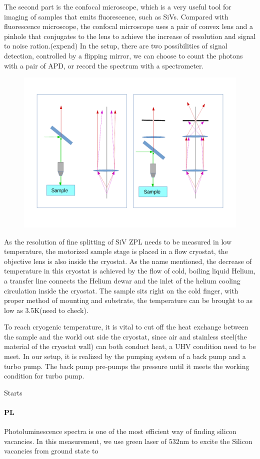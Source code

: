 The second part is the confocal microscope, which is a very useful tool for imaging of samples that emits fluorescence, such as SiVs. Compared with fluorescence microscope, the confocal microscope uses a pair of convex lens and a pinhole that conjugates to the lens to achieve the increase of resolution and signal to noise ration.(expend)
In the setup, there are two possibilities of signal detection, controlled by a flipping mirror, we can choose to count the photons with a pair of APD, or record the spectrum with a spectrometer.
\begin{figure}[h]
\centering
\includegraphics[width=0.7\linewidth]{Figures/pic/microscope}
\caption{}
\label{fig:microscope}
\end{figure}

As the resolution of fine splitting of SiV ZPL needs to be measured in low temperature, the motorized sample stage is placed in a flow cryostat, the objective lens is also inside the cryostat. As the name mentioned, the decrease of temperature in this cryostat is achieved by the flow of cold, boiling liquid Helium, a transfer line connects the Helium dewar and the inlet of the helium cooling circulation inside the cryostat. The sample sits right on the cold finger, with proper method of mounting and substrate, the temperature can be brought to as low as 3.5K(need to check).

To reach cryogenic temperature, it is vital to cut off the heat exchange between the sample and the world out side the cryostat, since air and stainless steel(the material of the cryostat wall) can both conduct heat, a UHV condition need to be meet. In our setup, it is realized by the pumping system of a back pump and a turbo pump. The back pump pre-pumps the pressure until it meets the working condition for turbo pump.

Starts


\paragraph{PL} Photoluminescence spectra is one of the most efficient way of finding silicon vacancies. In this measurement, we use green laser of 532nm to excite the Silicon vacancies from ground state to 

